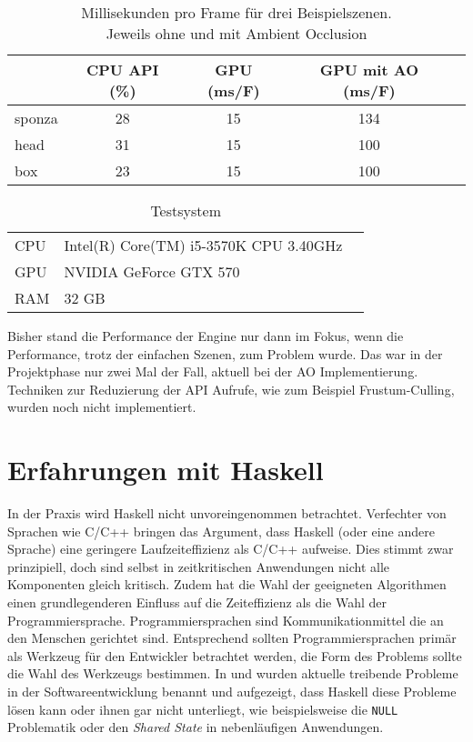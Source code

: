 \begin{table}[h]
\centering
\begin{tabular}{@{}lcccc@{}}
\toprule
       & CPU API (\%) & GPU (ms/F) & GPU mit \ac{AO} (ms/F) & \\ \midrule
sponza & 28  		  &  15  & 134  &  \\
head   & 31    		  &  15  & 100  &  \\
box    & 23    		  &  15  & 100  &  \\ \bottomrule
\end{tabular}
\caption{Millisekunden pro Frame für drei Beispielszenen.\\Jeweils ohne und mit Ambient Occlusion}\label{tab:performance}
\end{table}

\begin{table}[h]
\centering
\begin{tabular}{@{}llc@{}}
\toprule
CPU &  Intel(R) Core(TM) i5-3570K CPU \@ 3.40GHz  & \\
GPU &  NVIDIA GeForce GTX 570  & \\
RAM &  32 GB  & \\ \bottomrule
\end{tabular}
\caption{Testsystem}\label{tab:spec-system}
\end{table}

Bisher stand die Performance der Engine nur dann im Fokus, wenn die Performance, trotz der einfachen Szenen, zum Problem wurde. Das war in der Projektphase nur zwei Mal der Fall, aktuell bei der \ac{AO} Implementierung. Techniken zur Reduzierung der API Aufrufe, wie zum Beispiel Frustum-Culling, wurden noch nicht implementiert.

\section{Erfahrungen mit Haskell}\label{sec:xp-haskell}

In der Praxis wird Haskell nicht unvoreingenommen betrachtet. Verfechter von Sprachen wie C/C++ bringen das Argument, dass Haskell (oder eine andere Sprache) eine geringere Laufzeiteffizienz als C/C++ aufweise. Dies stimmt zwar prinzipiell, doch sind selbst in zeitkritischen Anwendungen nicht alle Komponenten gleich kritisch. Zudem hat die Wahl der geeigneten Algorithmen einen grundlegenderen Einfluss auf die Zeiteffizienz als die Wahl der Programmiersprache. Programmiersprachen sind Kommunikationmittel die an den Menschen gerichtet sind. Entsprechend sollten Programmiersprachen primär als Werkzeug für den Entwickler betrachtet werden, die Form des Problems sollte die Wahl des Werkzeugs bestimmen. In  und  wurden aktuelle treibende Probleme in der Softwareentwicklung benannt und aufgezeigt, dass Haskell diese Probleme lösen kann oder ihnen gar nicht unterliegt, wie beispielsweise die \texttt{NULL} Problematik oder den \textit{Shared State} in nebenläufigen Anwendungen.

